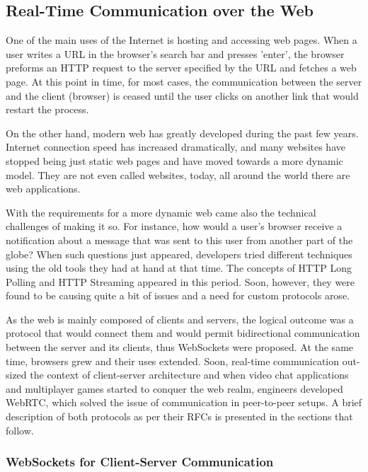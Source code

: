 \subsection{Real-Time Communication over the Web} %

One of the main uses of the Internet is hosting and accessing web pages. When a
user writes a URL in the browser's search bar and presses 'enter', the browser
preforms an HTTP request to the server specified by the URL and fetches a web
page. At this point in time, for most cases, the communication between the
server and the client (browser) is ceased until the user clicks on another link
that would restart the process.

On the other hand, modern web has greatly developed during the past few years.
Internet connection speed has increased dramatically, and many websites have
stopped being just static web pages and have moved towards a more dynamic model.
They are not even called websites, today, all around the world there are web
applications.

With the requirements for a more dynamic web came also the technical challenges
of making it so. For instance, how would a user's browser receive a notification
about a message that was sent to this user from another part of the globe? When
such questions just appeared, developers tried different techniques using the
old tools they had at hand at that time. The concepts of HTTP Long Polling and
HTTP Streaming appeared in this period. Soon, however, they were found to be
causing quite a bit of issues\cite{long_polling_issues} and a need for custom
protocols arose.

As the web is mainly composed of clients and servers, the logical outcome was a
protocol that would connect them and would permit bidirectional communication
between the server and its clients, thus WebSockets were proposed. At the same
time, browsers grew and their uses extended. Soon, real-time communication out-
sized the context of client-server architecture and when video chat applications
and multiplayer games started to conquer the web realm, engineers developed
WebRTC, which solved the issue of communication in peer-to-peer setups. A brief
description of both protocols as per their RFCs is presented in the sections
that follow.

\subsubsection{WebSockets for Client-Server Communication} %

